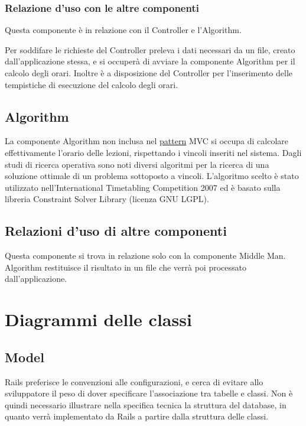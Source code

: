 \documentclass[11pt,a4paper]{article}
\begin{document}
\subsubsection{Relazione d'uso con le altre componenti}
Questa componente è in relazione con il Controller e l'Algorithm. 

Per soddifare le richieste del Controller preleva i dati necessari da un file, creato dall'applicazione stessa, e si occuperà di avviare la componente Algorithm per il calcolo degli orari.
Inoltre è a disposizione del Controller per l'inserimento delle tempistiche di esecuzione del calcolo degli orari.
\subsection{Algorithm}
La componente Algorithm non inclusa nel \underline{pattern} MVC si occupa di calcolare effettivamente l'orario delle lezioni, rispettando i vincoli inseriti nel sistema. Dagli studi di ricerca operativa sono noti diversi algoritmi per la ricerca di una soluzione ottimale di un problema sottoposto a vincoli. L'algoritmo scelto è stato utilizzato nell'International Timetabling Competition 2007 ed è basato sulla libreria Constraint Solver Library (licenza GNU LGPL).
\subsection{Relazioni d'uso di altre componenti}
Questa componente si trova in relazione solo con la componente Middle Man. Algorithm restituisce il risultato in un file che verrà poi processato dall'applicazione.

\section{Diagrammi delle classi}
\subsection{Model}
Rails preferisce le convenzioni alle configurazioni, e cerca di evitare allo sviluppatore il peso di dover specificare l'associazione tra tabelle e classi.
Non è quindi necessario illustrare nella specifica tecnica la struttura del database, in quanto verrà implementato da Rails a partire dalla struttura delle classi.
\end{document}
